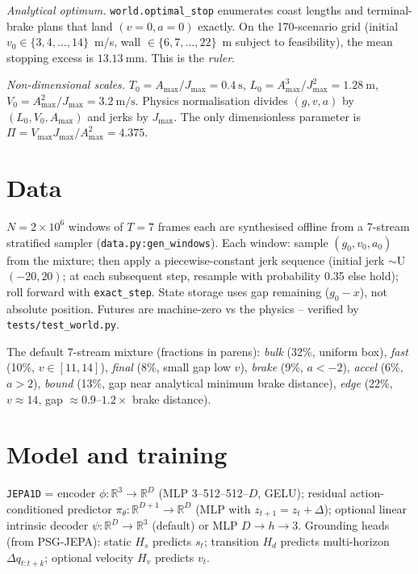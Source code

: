 \documentclass[11pt,a4paper]{article}
\begin{document}
\emph{Analytical optimum.} \texttt{world.optimal\_stop} enumerates coast
lengths and terminal-brake plans that land $(v{=}0, a{=}0)$ exactly. On the
170-scenario grid (initial $v_0 \in \{3, 4, \ldots, 14\}$~m/s, wall
$\in \{6, 7, \ldots, 22\}$~m subject to feasibility), the mean stopping excess
is $\SI{13.13}{\mm}$. This is the \emph{ruler}.

\emph{Non-dimensional scales.} $T_0 = A_{\max}/J_{\max} = \SI{0.4}{\s}$,
$L_0 = A_{\max}^3/J_{\max}^2 = \SI{1.28}{\m}$,
$V_0 = A_{\max}^2/J_{\max} = \SI{3.2}{\m/\s}$. Physics normalisation
divides $(g, v, a)$ by $(L_0, V_0, A_{\max})$ and jerks by $J_{\max}$. The only
dimensionless parameter is $\Pi = V_{\max} J_{\max}/A_{\max}^2 = 4.375$.

\section{Data}

$N = 2\times 10^6$ windows of $T{=}7$ frames each are synthesised offline from a
7-stream stratified sampler (\texttt{data.py:gen\_windows}). Each window: sample
$(g_0, v_0, a_0)$ from the mixture; then apply a piecewise-constant jerk
sequence (initial jerk $\sim$U$(-20, 20)$; at each subsequent step, resample
with probability 0.35 else hold); roll forward with \texttt{exact\_step}. State
storage uses gap remaining ($g_0 - x$), not absolute position. Futures are
machine-zero vs the physics -- verified by \texttt{tests/test\_world.py}.

The default 7-stream mixture (fractions in parens): \emph{bulk} (32\%, uniform
box), \emph{fast} (10\%, $v \in [11,14]$), \emph{final} (8\%, small gap
low $v$), \emph{brake} (9\%, $a<-2$), \emph{accel} (6\%, $a>2$), \emph{bound}
(13\%, gap near analytical minimum brake distance), \emph{edge} (22\%, $v\approx14$,
gap $\approx 0.9$--$1.2\times$ brake distance).

\section{Model and training}

\texttt{JEPA1D} = encoder $\phi: \mathbb{R}^3 \to \mathbb{R}^D$
(MLP 3--512--512--$D$, GELU); residual action-conditioned predictor $\pi_\theta:
\mathbb{R}^{D+1} \to \mathbb{R}^D$ (MLP with $z_{t+1} = z_t + \Delta$);
optional linear intrinsic decoder $\psi: \mathbb{R}^D \to \mathbb{R}^3$
(default) or MLP $D\to h\to 3$. Grounding heads (from PSG-JEPA): static
$H_s$ predicts $s_t$; transition $H_d$ predicts multi-horizon
$\Delta q_{t:t+k}$; optional velocity $H_v$ predicts $v_t$.
\end{document}
